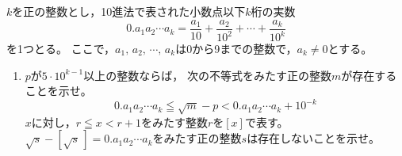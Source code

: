 \documentclass[../../main.tex]{subfiles}
\begin{document}
$k$を正の整数とし，10進法で表された小数点以下$k$桁の実数
\[ 0.a_1a_2 \cdots a_k=\frac{a_1}{10}+\frac{a_2}{{10}^2}+\cdots+\frac{a_k}{{10}^k} \]
を1つとる。
ここで，$a_1, \, a_2, \, \cdots, \, a_k$は0から9までの整数で，$a_k \neq 0$とする。
\begin{enumerate}
  $n$をすべて求めよ。
    \[ 0.a_1a_2 \cdots a_k \leqq \sqrt{n}-{10}^k < 0.a_1a_2 \cdots a_k + {10}^{-k} \]
  \item$p$が$5 \cdot {10}^{k-1}$以上の整数ならば，
    次の不等式をみたす正の整数$m$が存在することを示せ。
    \[ 0.a_1a_2 \cdots a_k \leqq \sqrt{m}-p < 0.a_1a_2 \cdots a_k + {10}^{-k} \]
  $x$に対し，$r \leqq x < r+1$をみたす整数$r$を$[x]$で表す。
    $\sqrt{s}-[\sqrt{s} \, ]=0.a_1a_2 \cdots a_k$をみたす正の整数$s$は存在しないことを示せ。
\end{enumerate}
\end{document}
